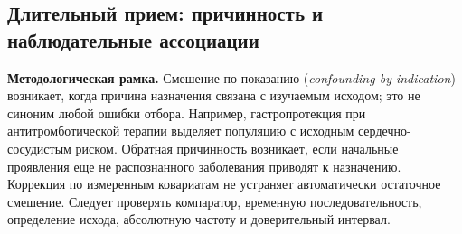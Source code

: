 \documentclass[11pt,a4paper,notitlepage]{report}
\newcommand{\src}[1]{\unskip\space\cite{#1}}
\begin{document}
\subsection{Длительный прием: причинность и наблюдательные ассоциации}
\label{sec:longterm-causality}
\textbf{Методологическая рамка.} Смешение по показанию (\textit{confounding by indication}) возникает, когда причина назначения связана с изучаемым исходом; это не синоним любой ошибки отбора. Например, гастропротекция при антитромботической терапии выделяет популяцию с исходным сердечно-сосудистым риском. Обратная причинность возникает, если начальные проявления еще не распознанного заболевания приводят к назначению. Коррекция по измеренным ковариатам не устраняет автоматически остаточное смешение. Следует проверять компаратор, временную последовательность, определение исхода, абсолютную частоту и доверительный интервал.\src{acggerd}
\end{document}
